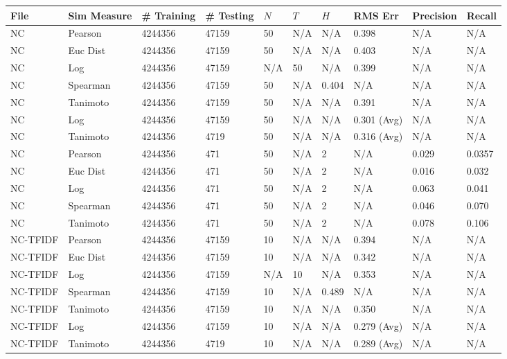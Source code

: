 \documentclass{article}
\begin{document}
\begin{longtable}{ |p{1.7cm}|p{1.9cm}|p{1.5cm}|p{1.5cm}|p{0.75cm}|p{0.75cm}|p{0.75cm}|p{0.75cm}|p{1.5cm}|p{1.5cm}|}
    \hline
    File & Sim Measure & \# Training & \# Testing & $N$ & $T$ & $H$ & RMS Err & Precision & Recall \\ \hline\hline
    NC & Pearson & 4244356 & 47159 & 50 & N/A & N/A & 0.398 & N/A & N/A  \\ \hline
    NC  & Euc Dist & 4244356 & 47159 & 50 & N/A & N/A & 0.403 & N/A & N/A   \\ \hline
    NC  & Log & 4244356 & 47159  & N/A &  50 & N/A& 0.399 & N/A & N/A  \\ \hline
    NC  & Spearman & 4244356 & 47159  & 50 & N/A & 0.404 & N/A & N/A & N/A \\ \hline
    NC  & Tanimoto & 4244356 & 47159 & 50 & N/A& N/A & 0.391 & N/A & N/A \\ \hline
    NC  & Log & 4244356 & 47159 & 50 & N/A& N/A & 0.301 (Avg) & N/A & N/A \\ \hline
    NC  & Tanimoto & 4244356 & 4719 & 50 & N/A & N/A & 0.316 (Avg) & N/A & N/A \\ \hline
    
    NC  & Pearson & 4244356 & 471 & 50 & N/A  & 2 & N/A & 0.029 & 0.0357  \\ \hline
    NC  & Euc Dist & 4244356 & 471 & 50 & N/A  & 2 & N/A & 0.016 & 0.032   \\ \hline
    NC  & Log & 4244356 & 471& 50 & N/A & 2 & N/A & 0.063 & 0.041  \\ \hline
    NC  & Spearman & 4244356 & 471 & 50 & N/A  & 2 & N/A &0.046 & 0.070 \\ \hline
    NC  & Tanimoto & 4244356 & 471 & 50 & N/A  & 2 & N/A & 0.078 & 0.106 \\ \hline
    
    NC-TFIDF & Pearson & 4244356 & 47159 & 10 & N/A & N/A & 0.394 & N/A & N/A  \\ \hline
    NC-TFIDF  & Euc Dist & 4244356 & 47159 & 10 & N/A & N/A & 0.342 & N/A & N/A   \\ \hline
    NC-TFIDF  & Log & 4244356 & 47159  & N/A &  10 & N/A& 0.353 & N/A & N/A  \\ \hline
    NC-TFIDF  & Spearman & 4244356 & 47159  & 10 & N/A & 0.489 & N/A & N/A & N/A \\ \hline
    NC-TFIDF  & Tanimoto & 4244356 & 47159 & 10 & N/A& N/A & 0.350 & N/A & N/A \\ \hline
    NC-TFIDF  & Log & 4244356 & 47159 & 10 & N/A& N/A & 0.279 (Avg) & N/A & N/A \\ \hline
    NC-TFIDF  & Tanimoto & 4244356 & 4719 & 10 & N/A & N/A & 0.289 (Avg) & N/A & N/A \\ \hline
    

\end{longtable}
\end{document}
